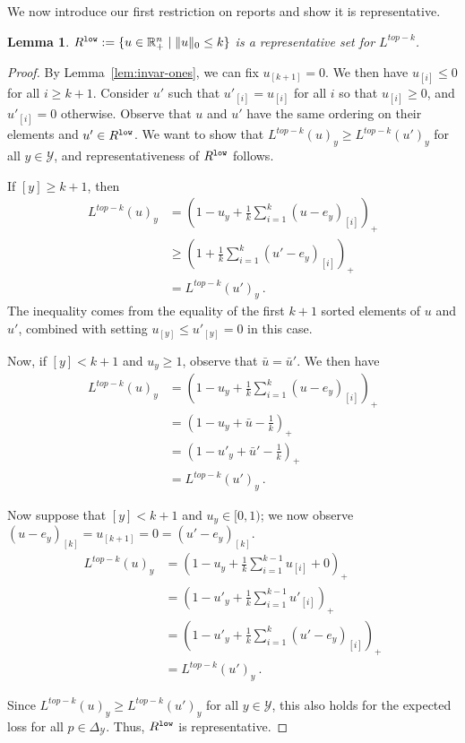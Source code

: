 \documentclass[12pt]{article}
\newcommand{\reals}{\mathbb{R}}
\newcommand{\simplex}{\Delta_\Y}
\newcommand{\Y}{\mathcal{Y}}
\newtheorem{lemma}{Lemma}
\begin{document}
We now introduce our first restriction on reports and show it is representative.
\begin{lemma}\label{lem:extra-elts-zero}
	$R^{\tt low} := \{u \in \reals^n_+ \mid \|u\|_0 \leq k\}$ is a representative set for $L^{top-k}$.
\end{lemma}
\begin{proof}
	By Lemma~\ref{lem:invar-ones}, we can fix $u_{[k+1]} = 0$.
	We then have $u_{[i]} \leq 0$ for all $i \geq k+1$.
	Consider $u'$ such that $u'_{[i]} = u_{[i]}$ for all $i$ so that $u_{[i]} \geq 0$, and $u'_{[i]} = 0$ otherwise.
	Observe that $u$ and $u'$ have the same ordering on their elements and $u' \in R^{\tt low}$.
	We want to show that $L^{top-k}(u)_y \geq L^{top-k}(u')_y$ for all $y \in \Y$, and representativeness of $R^{\tt low}$ follows.
	
	If $[y] \geq k+1$, then 
	\begin{align*}
	L^{top-k}(u)_y &= \left(1 - u_y + \frac 1 k \sum_{i=1}^k (u - e_y)_{[i]}\right)_+ \\
	&\geq \left(1 + \frac {1}{k} \sum_{i=1}^k (u' - e_y)_{[i]}\right)_+\\
	&= L^{top-k}(u')_y~.~
	\end{align*}
	The inequality comes from the equality of the first $k+1$ sorted elements of $u$ and $u'$, combined with setting $u_{[y]} \leq u'_{[y]} = 0$ in this case.
	
	Now, if $[y] < k+1$ and $u_y \geq 1$, observe that $\bar u = \bar u'$.
	We then have 
	\begin{align*}
	L^{top-k}(u)_y &= \left(1 - u_y + \frac 1 k \sum_{i=1}^k (u - e_y)_{[i]}\right)_+ \\
	&= \left(1 - u_y + \bar u - \frac 1 k\right)_+\\
	&= \left(1 - u'_y + \bar u' - \frac 1 k\right)_+\\
	&= L^{top-k}(u')_y~.~
	\end{align*}
	
	Now suppose that $[y] < k+1$ and $u_y \in [0,1)$; we now observe $(u - e_y)_{[k]} = u_{[k+1]} = 0 = (u' - e_y)_{[k]}$. 
	\begin{align*}
	L^{top-k}(u)_y &= \left(1 - u_y + \frac 1 k \sum_{i=1}^{k-1} u_{[i]} + 0 \right)_+\\
	&= \left(1 - u'_y + \frac 1 k \sum_{i=1}^{k-1} u'_{[i]}\right)_+\\
	&= \left(1 - u'_y + \frac 1 k \sum_{i=1}^{k} (u' - e_y)_{[i]}\right)_+\\
	&= L^{top-k}(u')_y~.~
	\end{align*}

	Since $L^{top-k}(u)_y \geq L^{top-k}(u')_y$ for all $y \in \Y$, this also holds for the expected loss for all $p \in \simplex$.
	Thus, $R^{\tt low}$ is representative.
\end{proof}
\end{document}
